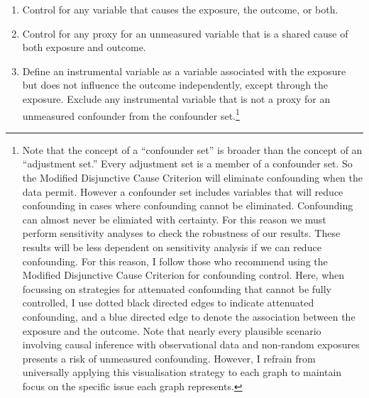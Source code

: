 \documentclass[
  singlecolumn,
  9pt]{article}
\providecommand{\tightlist}{%
  \setlength{\itemsep}{0pt}\setlength{\parskip}{0pt}}\usepackage{longtable,booktabs,array}
\begin{document}
\begin{enumerate}
\def\labelenumi{\alph{enumi}.}
\tightlist
\item
  Control for any variable that causes the exposure, the outcome, or
  both.
\item
  Control for any proxy for an unmeasured variable that is a shared
  cause of both exposure and outcome.
\item
  Define an instrumental variable as a variable associated with the
  exposure but does not influence the outcome independently, except
  through the exposure. Exclude any instrumental variable that is not a
  proxy for an unmeasured confounder from the confounder set.\footnote{Note
    that the concept of a ``confounder set'' is broader than the concept
    of an ``adjustment set.'' Every adjustment set is a member of a
    confounder set. So the Modified Disjunctive Cause Criterion will
    eliminate confounding when the data permit. However a confounder set
    includes variables that will reduce confounding in cases where
    confounding cannot be eliminated. Confounding can almost never be
    elimiated with certainty. For this reason we must perform
    sensitivity analyses to check the robustness of our results. These
    results will be less dependent on sensitivity analysis if we can
    reduce confounding. For this reason, I follow those who recommend
    using the Modified Disjunctive Cause Criterion for confounding
    control. Here, when focussing on strategies for attenuated
    confounding that cannot be fully controlled, I use dotted black
    directed edges to indicate attenuated confounding, and a blue
    directed edge to denote the association between the exposure and the
    outcome. Note that nearly every plausible scenario involving causal
    inference with observational data and non-random exposures presents
    a risk of unmeasured confounding. However, I refrain from
    universally applying this visualisation strategy to each graph to
    maintain focus on the specific issue each graph represents.}
\end{enumerate}
\end{document}

